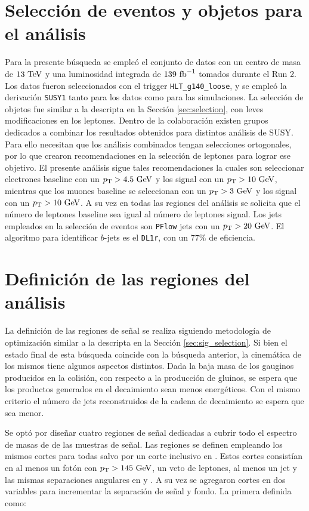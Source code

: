 \section{Selección de eventos y objetos para el análisis}

Para la presente búsqueda se empleó el conjunto de datos con un centro de masa de $13\ \text{TeV}$ y una luminosidad integrada de $139\ \text{fb}^{-1}$ tomados durante el Run 2. Los datos fueron seleccionados con el trigger \texttt{HLT\_g140\_loose}, y se empleó la derivación \texttt{SUSY1} tanto para los datos como para las simulaciones. La selección de objetos fue similar a la descripta en la Sección \ref{sec:selection}, con leves modificaciones en los leptones. Dentro de la colaboración existen grupos dedicados a combinar los resultados obtenidos para distintos análisis de SUSY. Para ello necesitan que los análisis combinados tengan selecciones ortogonales, por lo que crearon recomendaciones en la selección de leptones para lograr ese objetivo. El presente análisis sigue tales recomendaciones la cuales son seleccionar electrones baseline con un $p_{\text{T}}>4.5\ \text{GeV}$ y los signal con un $p_{\text{T}}>10 \ \text{GeV}$, mientras que los muones baseline se seleccionan con un $p_{\text{T}}>3\ \text{GeV}$ y los signal con un $p_{\text{T}}>10\ \text{GeV}$. A su vez en todas las regiones del análisis se solicita que el número de leptones baseline sea igual al número de leptones signal. Los jets empleados en la selección de eventos son \texttt{PFlow} jets con un $p_{\text{T}}>20\ \text{GeV}$. El algoritmo para identificar $b$-jets es el \texttt{DL1r}, con un $77\%$ de eficiencia.



\section{Definición de las regiones del análisis}

La definición de las regiones de señal se realiza siguiendo metodología de optimización similar a la descripta en la Sección \ref{sec:sig_selection}.
Si bien el estado final de esta búsqueda coincide con la búsqueda anterior, la cinemática de los mismos tiene algunos aspectos distintos. Dada la baja masa de los gauginos producidos en la colisión, con respecto a la producción de gluinos, se espera que los productos generados en el decaimiento sean menos energéticos. Con el mismo criterio el número de jets reconstruidos de la cadena de decaimiento se espera que sea menor.

Se optó por diseñar cuatro regiones de señal dedicadas a cubrir todo el espectro de masas de \ninoone de las muestras de señal. Las regiones se definen empleando los mismos cortes para todas salvo por un corte inclusivo en \met. Estos cortes consistían en al menos un fotón con $p_{\text{T}}>145\ \text{GeV}$, un veto de leptones, al menos un jet y las mismas separaciones angulares en \dphijetmet y \dphigammet. A su vez se agregaron cortes en dos variables para incrementar la separación de señal y fondo. La primera definida como:

